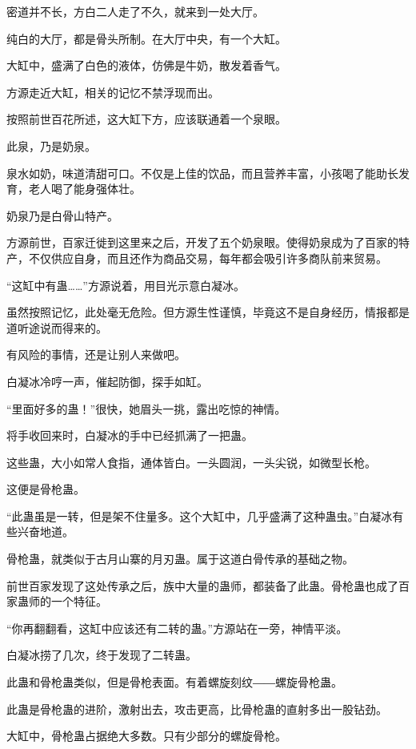 
\begin{this_body}

密道并不长，方白二人走了不久，就来到一处大厅。

纯白的大厅，都是骨头所制。在大厅中央，有一个大缸。

大缸中，盛满了白色的液体，仿佛是牛奶，散发着香气。

方源走近大缸，相关的记忆不禁浮现而出。

按照前世百花所述，这大缸下方，应该联通着一个泉眼。

此泉，乃是奶泉。

泉水如奶，味道清甜可口。不仅是上佳的饮品，而且营养丰富，小孩喝了能助长发育，老人喝了能身强体壮。

奶泉乃是白骨山特产。

方源前世，百家迁徙到这里来之后，开发了五个奶泉眼。使得奶泉成为了百家的特产，不仅供应自身，而且还作为商品交易，每年都会吸引许多商队前来贸易。

“这缸中有蛊……”方源说着，用目光示意白凝冰。

虽然按照记忆，此处毫无危险。但方源生性谨慎，毕竟这不是自身经历，情报都是道听途说而得来的。

有风险的事情，还是让别人来做吧。

白凝冰冷哼一声，催起防御，探手如缸。

“里面好多的蛊！”很快，她眉头一挑，露出吃惊的神情。

将手收回来时，白凝冰的手中已经抓满了一把蛊。

这些蛊，大小如常人食指，通体皆白。一头圆润，一头尖锐，如微型长枪。

这便是骨枪蛊。

“此蛊虽是一转，但是架不住量多。这个大缸中，几乎盛满了这种蛊虫。”白凝冰有些兴奋地道。

骨枪蛊，就类似于古月山寨的月刃蛊。属于这道白骨传承的基础之物。

前世百家发现了这处传承之后，族中大量的蛊师，都装备了此蛊。骨枪蛊也成了百家蛊师的一个特征。

“你再翻翻看，这缸中应该还有二转的蛊。”方源站在一旁，神情平淡。

白凝冰捞了几次，终于发现了二转蛊。

此蛊和骨枪蛊类似，但是骨枪表面。有着螺旋刻纹――螺旋骨枪蛊。

此蛊是骨枪蛊的进阶，激射出去，攻击更高，比骨枪蛊的直射多出一股钻劲。

大缸中，骨枪蛊占据绝大多数。只有少部分的螺旋骨枪。


\end{this_body}
